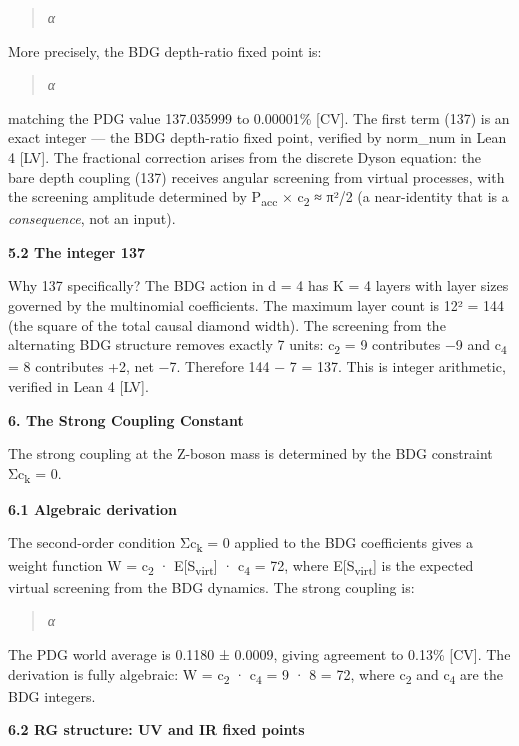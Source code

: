 \documentclass[12pt,a4paper]{article}
\begin{document}
\begin{quote}
\emph{α}
\end{quote}

More precisely, the BDG depth-ratio fixed point is:

\begin{quote}
\emph{α}
\end{quote}

matching the PDG value 137.035999 to 0.00001\% {[}CV{]}. The first term
(137) is an exact integer --- the BDG depth-ratio fixed point, verified
by norm\_num in Lean 4 {[}LV{]}. The fractional correction arises from
the discrete Dyson equation: the bare depth coupling (137) receives
angular screening from virtual processes, with the screening amplitude
determined by P\textsubscript{acc} × c\textsubscript{2} ≈ π²/2 (a
near-identity that is a \emph{consequence}, not an input).

\textbf{5.2 The integer 137}

Why 137 specifically? The BDG action in d = 4 has K = 4 layers with
layer sizes governed by the multinomial coefficients. The maximum layer
count is 12² = 144 (the square of the total causal diamond width). The
screening from the alternating BDG structure removes exactly 7 units:
c\textsubscript{2} = 9 contributes −9 and c\textsubscript{4} = 8
contributes +2, net −7. Therefore 144 − 7 = 137. This is integer
arithmetic, verified in Lean 4 {[}LV{]}.

\textbf{6. The Strong Coupling Constant}

The strong coupling at the Z-boson mass is determined by the BDG
constraint Σc\textsubscript{k} = 0.

\textbf{6.1 Algebraic derivation}

The second-order condition Σc\textsubscript{k} = 0 applied to the BDG
coefficients gives a weight function W = c\textsubscript{2} ·
E{[}S\textsubscript{virt}{]} · c\textsubscript{4} = 72, where
E{[}S\textsubscript{virt}{]} is the expected virtual screening from the
BDG dynamics. The strong coupling is:

\begin{quote}
\emph{α}
\end{quote}

The PDG world average is 0.1180 ± 0.0009, giving agreement to 0.13\%
{[}CV{]}. The derivation is fully algebraic: W = c\textsubscript{2} ·
c\textsubscript{4} = 9 · 8 = 72, where c\textsubscript{2} and
c\textsubscript{4} are the BDG integers.

\textbf{6.2 RG structure: UV and IR fixed points}
\end{document}
